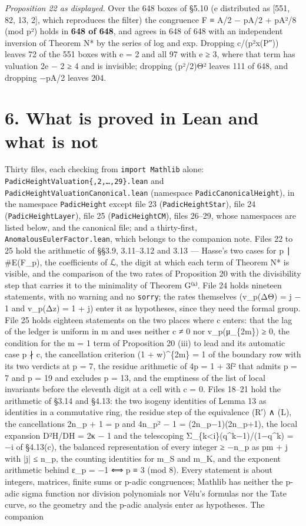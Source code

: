 \documentclass[11pt,a4paper]{article}
\theoremstyle{named}
\begin{document}
\textit{Proposition 22 as displayed.} Over the 648 boxes of §5.10 (e distributed as [551, 82, 13, 2], which reproduces the filter) the congruence F ≡ A/2 − pA/2 + pA²/8 (mod p²) holds in \textbf{648 of 648}, and agrees in 648 of 648 with an independent inversion of Theorem N* by the series of log and exp. Dropping c/(p²x(P″)) leaves 72 of the 551 boxes with e = 2 and all 97 with e ≥ 3, where that term has valuation 2e − 2 ≥ 4 and is invisible; dropping (p²/2)Θ² leaves 111 of 648, and dropping −pA/2 leaves 204.

\section*{6. What is proved in Lean and what is not}

Thirty files, each checking from \texttt{import\ \allowbreak{}Mathlib} alone: \texttt{PadicHeightValuation\{,2,…,29\}.\allowbreak{}lean} and \texttt{PadicHeightValuationCanonical.\allowbreak{}lean} (namespace \texttt{PadicCanonicalHeight}), in the namespace \texttt{PadicHeight} except file 23 (\texttt{PadicHeightStar}), file 24 (\texttt{PadicHeightLayer}), file 25 (\texttt{PadicHeightCM}), files 26–29, whose namespaces are listed below, and the canonical file; and a thirty-first, \texttt{AnomalousEulerFactor.\allowbreak{}lean}, which belongs to the companion note. Files 22 to 25 hold the arithmetic of §§3.9, 3.11–3.12 and 3.13 — Hasse's two cases for p ∣ \#E(F\_p), the coefficients of ℒ, the digit at which each term of Theorem N* is visible, and the comparison of the two rates of Proposition 20 with the divisibility step that carries it to the minimality of Theorem G⁽ᵏ⁾. File 24 holds nineteen statements, with no warning and no \texttt{sorry}; the rates themselves (v\_p(ΔΘ) = j − 1 and v\_p(Δz) = 1 + j) enter it as hypotheses, since they need the formal group. File 25 holds eighteen statements on the two places where c enters: that the lag of the ledger is uniform in m and uses neither c ≠ 0 nor v\_p(μ\_\{2m\}) ≥ 0, the condition for the m = 1 term of Proposition 20 (iii) to lead and its automatic case p ∤ c, the cancellation criterion (1 + w)\textasciicircum{}\{2m\} = 1 of the boundary row with its two verdicts at p = 7, the residue arithmetic of 4p = 1 + 3f² that admits p = 7 and p = 19 and excludes p = 13, and the emptiness of the list of local invariants before the eleventh digit at a cell with c = 0. Files 18–21 hold the arithmetic of §3.14 and §4.13: the two isogeny identities of Lemma 13 as identities in a commutative ring, the residue step of the equivalence (R′) ∧ (L), the cancellations 2n\_p + 1 = p and 4n\_p² − 1 = (2n\_p−1)(2n\_p+1), the local expansion D²H/DH = 2κ − 1 and the telescoping Σ\_\{k\textless{}i\}(q\textasciicircum{}k−1)/(1−q\textasciicircum{}k) = −i of §4.13(c), the balanced representation of every integer ≥ −n\_p as pm + j with |j| ≤ n\_p, the counting identities for m\_S and m\_K, and the exponent arithmetic behind ε\_p = −1 ⟺ p ≡ 3 (mod 8). Every statement is about integers, matrices, finite sums or p-adic congruences; Mathlib has neither the p-adic sigma function nor division polynomials nor Vélu's formulas nor the Tate curve, so the geometry and the p-adic analysis enter as hypotheses. The companion 
\end{document}
